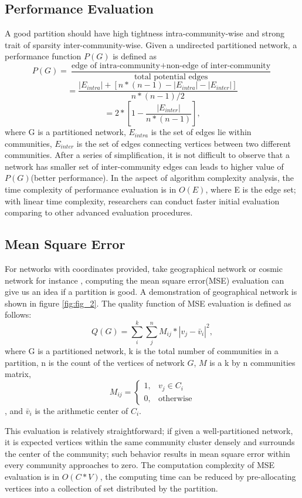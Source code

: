 \documentclass[12pt]{article}
\begin{document}
\subsection{Performance Evaluation}
A good partition should have high tightness intra-community-wise and strong trait of sparsity inter-community-wise. Given a undirected partitioned network, a performance function $P(G)$ is defined as
$$P(G) = \frac{\text{edge of intra-community} + \text{non-edge of inter-community}}{\text{total potential edges}}$$
$$=\frac{|E_{intra}| + [n*(n-1) - |E_{intra}| - |E_{inter}|]}{n*(n-1)/2}$$
$$=2*\left[ 1 - \frac{ |E_{inter}| } { n*\left( n-1 \right) }  \right],$$
where G is a partitioned network, $E_{intra}$ is the set of edges lie within communities, $E_{inter}$ is the set of edges connecting vertices between two different communities. After a series of simplification, it is not difficult to observe that a network has smaller set of inter-community edges can leads to higher value of $P(G)$(better performance)\cite{7}. In the aspect of algorithm complexity analysis, the time complexity of performance evaluation is in $O(E)$, where E is the edge set; with linear time complexity, researchers can conduct faster initial evaluation comparing to other advanced evaluation procedures.

\subsection{Mean Square Error}
For networks with coordinates provided, take geographical network or cosmic network for instance \cite{9,10}, computing the mean square error(MSE) evaluation can give us an idea if a partition is good. A demonstration of geographical network is shown in figure \ref{fig:fig_2}. The quality function of MSE evaluation is defined as follows:
    $$Q(G) = \sum_{i}^{k}\sum_{j}^{n} M_{i j} * |v_{j} - \bar{v}_{i}|^{2},$$
where G is a partitioned network, k is the total number of communities in a partition, n is the count of the vertices of network $G$, $M$ is a k by n communities matrix, \[
  M_{ij} = 
  \begin{cases}
    1, &  v_{j} \in C_i\\
    0, & \text{otherwise}
  \end{cases}
\]
, and $\bar{v}_{i}$ is the arithmetic center of $C_i$. 

\bigbreak

This evaluation is relatively straightforward; if given a well-partitioned network, it is expected vertices within the same community cluster densely and surrounds the center of the community; such behavior results in mean square error within every community approaches to zero. The computation complexity of MSE evaluation is in $O(C*V)$, the computing time can be reduced by pre-allocating vertices into a collection of set distributed by the partition.
\end{document}
